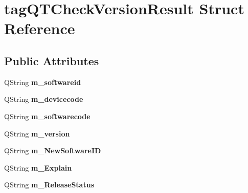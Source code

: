 \hypertarget{structtag_q_t_check_version_result}{}\section{tag\+Q\+T\+Check\+Version\+Result Struct Reference}
\label{structtag_q_t_check_version_result}
\subsection*{Public Attributes}
\begin{DoxyCompactItemize}
\item 
\mbox{\label{structtag_q_t_check_version_result_a385f775c5e0e1bb70e70e295338915c3}} 
Q\+String {\bfseries m\+\_\+softwareid}
\item 
\mbox{\label{structtag_q_t_check_version_result_a41dfa91323e438fbe457ad8871a3d42a}} 
Q\+String {\bfseries m\+\_\+devicecode}
\item 
\mbox{\label{structtag_q_t_check_version_result_a5b7ec50d58c475b3c0d27ac38c102b44}} 
Q\+String {\bfseries m\+\_\+softwarecode}
\item 
\mbox{\label{structtag_q_t_check_version_result_a2789d99481eea3b3c7a392706bb3b1cf}} 
Q\+String {\bfseries m\+\_\+version}
\item 
\mbox{\label{structtag_q_t_check_version_result_a57fdb403017065a141a59502fe96e132}} 
Q\+String {\bfseries m\+\_\+\+New\+Software\+ID}
\item 
\mbox{\label{structtag_q_t_check_version_result_a621f1cd9436f6cb047a8860a546c40de}} 
Q\+String {\bfseries m\+\_\+\+Explain}
\item 
\mbox{\label{structtag_q_t_check_version_result_a62fd66b1caa24d2be33c1bc20addc19d}} 
Q\+String {\bfseries m\+\_\+\+Release\+Status}
\item 
\mbox{\label{structtag_q_t_check_version_result_a065b1568aed51dc5d0e7c6fd904e88a9}} 

\end{DoxyCompactItemize}
